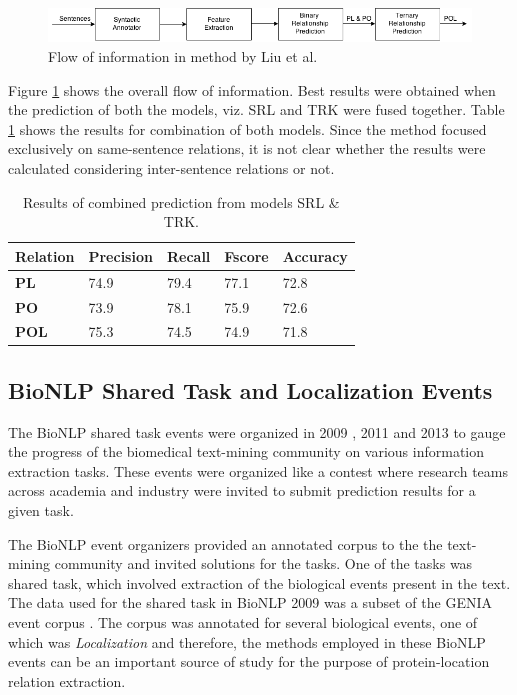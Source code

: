 \begin{figure}
\includegraphics[scale=0.5]{figures/Liu_Flow.png}
\caption{Flow of information in method by Liu et al.}\label{fig:LiuFlow}
\end{figure}

Figure \ref{fig:LiuFlow} shows the overall flow of information. Best results were obtained when the prediction of both the models, viz. SRL and TRK were fused together. Table \ref{tab:LiuRes} shows the results for combination of both models. Since the method focused exclusively on same-sentence relations, it is not clear whether the results were calculated considering inter-sentence relations or not.

\begin{table}
\centering
\begin{tabular}{|l|l|l|l|l|}
\hline
\textbf{Relation} & \textbf{Precision} & \textbf{Recall} & \textbf{Fscore} & \textbf{Accuracy} \\ \hline
\textbf{PL} & 74.9 & 79.4 & 77.1 & 72.8 \\
\textbf{PO} & 73.9 & 78.1 & 75.9 & 72.6 \\
\textbf{POL} & 75.3 & 74.5 & 74.9 &  71.8\\ \hline
\end{tabular}
\caption{Results of combined prediction from models SRL \& TRK.}\label{tab:LiuRes}
\end{table}

\subsection{BioNLP Shared Task and Localization Events}

The BioNLP shared task events were organized in 2009 \cite{kim2009overview}, 2011 and 2013 to gauge the progress of the biomedical text-mining community on various information extraction tasks. These events were organized like a contest where research teams across academia and industry were invited to submit prediction results for a given task. 

The BioNLP event organizers provided an annotated corpus to the the text-mining community and invited solutions for the tasks. One of the tasks was shared task,  which involved extraction of the biological events present in the text. The data used for the shared task in BioNLP 2009 was a subset of the GENIA event corpus \cite{kim2008corpus}. The corpus was annotated for several biological events, one of which was \textit{Localization} and therefore, the methods employed in these BioNLP events can be an important source of study for the purpose of protein-location relation extraction.


